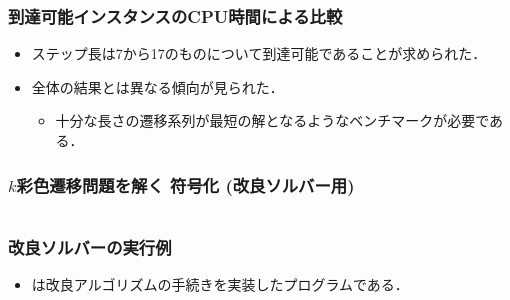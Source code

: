 \begin{frame}
  \frametitle{到達可能インスタンスのCPU時間による比較}

  \begin{exampleblock}{}
    \centering
    \scalebox{0.75}{}
  \end{exampleblock}
  \begin{itemize}
    \item ステップ長は7から17のものについて到達可能であることが求められた．
    \item 全体の結果とは異なる傾向が見られた．
      \begin{itemize}
        \item 十分な長さの遷移系列が最短の解となるようなベンチマークが必要である．
      \end{itemize}
  \end{itemize}
\end{frame}
\begin{frame}[shrink]
  \frametitle{$k$彩色遷移問題を解く 符号化 {\small(改良ソルバー用)}}

\begin{columns}[t]
\begin{column}{0.9\linewidth}
\begin{exampleblock}{}
 
\end{exampleblock}    
\end{column}
\end{columns}
\end{frame}
\begin{frame}[shrink]
  \frametitle{改良ソルバーの実行例}

  \begin{exampleblock}{}
     
  \end{exampleblock}
  \begin{itemize}
    \item {}は改良アルゴリズムの手続きを実装したプログラムである．
  \end{itemize}
\end{frame}
